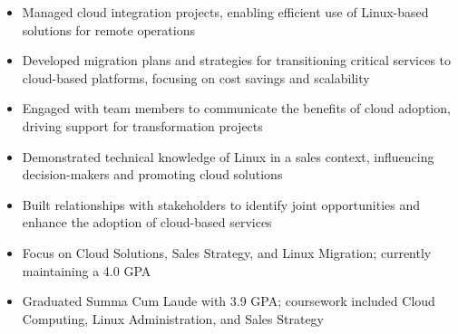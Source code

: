 \par\smallskip
\noindent
\begin{minipage}{20cm}
  \begin{minipage}{9.75cm}
    \begin{itemize}
      \item Managed cloud integration projects, enabling efficient use of Linux-based solutions for remote operations
      \item Developed migration plans and strategies for transitioning critical services to cloud-based platforms, focusing on cost savings and scalability
      \item Engaged with team members to communicate the benefits of cloud adoption, driving support for transformation projects
    \end{itemize}
  \end{minipage}
  \hfill
  \begin{minipage}{9.75cm}
    \begin{itemize}
      \item Demonstrated technical knowledge of Linux in a sales context, influencing decision-makers and promoting cloud solutions
      \item Built relationships with stakeholders to identify joint opportunities and enhance the adoption of cloud-based services
    \end{itemize}
  \end{minipage}
\end{minipage}

\begin{itemize}
  \item Focus on Cloud Solutions, Sales Strategy, and Linux Migration; currently maintaining a 4.0 GPA
\end{itemize}
\divider

\begin{itemize}
  \item Graduated Summa Cum Laude with 3.9 GPA; coursework included Cloud Computing, Linux Administration, and Sales Strategy
\end{itemize}

\noindent
\begin{minipage}{20cm}
     
     
     
\end{minipage}


